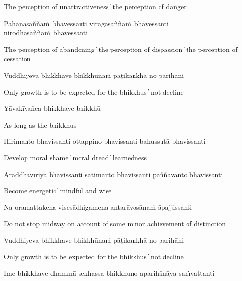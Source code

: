 \begin{cprenglish}
  The perception of unattractiveness  ̓  the perception of danger
\end{cprenglish}

Pahānasaññaṁ bhāvessanti virāgasaññaṁ bhāvessanti nirodhasaññaṁ bhāvessanti

\begin{cprenglish}
  The perception of abandoning  ̓  the perception of dispassion  ̓
  the perception of cessation
\end{cprenglish}

Vuddhiyeva bhikkhave bhikkhūnaṁ pāṭikaṅkhā no parihāni

\begin{cprenglish}
  Only growth is to be expected for the bhikkhus  ̓  not decline
\end{cprenglish}

Yāvakīvañca bhikkhave bhikkhū

\begin{cprenglish}
  As long as the bhikkhus
\end{cprenglish}

Hirimanto bhavissanti ottappino bhavissanti bahussutā bhavissanti

\begin{cprenglish}
  Develop moral shame  ̓  moral dread  ̓  learnedness
\end{cprenglish}

Āraddhavīriyā bhavissanti satimanto bhavissanti paññavanto bhavissanti

\begin{cprenglish}
  Become energetic  ̓  mindful and wise
\end{cprenglish}

Na oramattakena visesādhigamena antarāvosānaṁ āpajjissanti

\begin{cprenglish}
  Do not stop midway on account of some minor achievement of distinction
\end{cprenglish}

Vuddhiyeva bhikkhave bhikkhūnaṁ pāṭikaṅkhā no parihāni

\begin{cprenglish}
  Only growth is to be expected for the bhikkhus  ̓  not decline
\end{cprenglish}


Ime bhikkhave dhammā sekhassa bhikkhuno aparihānāya saṁvattanti

